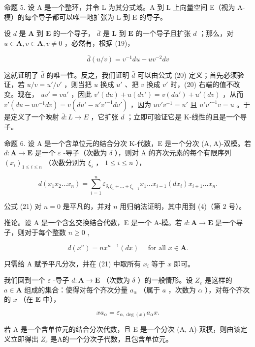 命题 5. 设 A 是一个整环，并令 L 为其分式域。A 到 L 上向量空间 E（视为 A-模）的每个导子都可以唯一地扩张为 L 到 E 的导子。

设 \(d\) 是 \(\mathbf{A}\) 到 \(\mathbf{E}\) 的一个导子， \(\bar{d}\) 是 \(\mathbf{L}\) 到 \(\mathbf{E}\) 的一个导子且扩张 \(d\) ；那么，对 \(u \in \mathbf{A}, v \in \mathbf{A}, v \neq 0\) ，必然有，根据 (19)，

\[
\bar {d} (u / v) = v ^ {- 1} d u - u v ^ {- 2} d v\tag{20}
\]

这就证明了 \(\bar{d}\) 的唯一性。反之，我们证明 \(\bar{d}\) 可以由公式 (20) 定义；首先必须验证，若 \(u / v = u' / v'\) ，则当把 \(u\) 换成 \(u'\) 、把 \(v\) 换成 \(v'\) 时，(20) 右端的值不改变。现在， \(uv' = vu'\) ，因此 \(v'(du) + u(dv') = v(du') + u'(dv)\) ，从而 \(v'(du - uv^{-1}dv) = v(du' - u'v'^{-1}dv')\) ，因为 \(uv'v^{-1} = u'\) 且 \(u'v'^{-1}v = u\) 。于是定义了一个映射 \(\bar{d}: L \to E\) ，它扩张 \(d\) ；立即可验证它是 K-线性的且是一个导子。

命题 6. 设 A 是一个含单位元的结合分次 K-代数，E 是一个分次 (A, A)-双模。若 \(d: \mathbf{A} \to \mathbf{E}\) 是一个 \(\varepsilon\) -导子（次数为 \(\delta\) ），则对 A 的齐次元素的每个有限序列 \((x_i)_{1 \leqslant i \leqslant n}\) （次数分别为 \(\xi_i\) ， \(1 \leqslant i \leqslant n\) ），

\[
d \left(x _ {1} x _ {2} \dots x _ {n}\right) = \sum_ {i = 1} ^ {n} \varepsilon_ {\delta, \xi_ {1} + \dots + \xi_ {i - 1}} x _ {1} \dots x _ {i - 1} \left(d x _ {i}\right) x _ {i + 1} \dots x _ {n}.\tag{21}
\]

公式 (21) 对 \(n = 0\) 是平凡的，并对 \(n\) 用归纳法证明，其中用到 (4)（第 2 号）。

推论。设 A 是一个含幺交换结合代数，E 是一个 A-模。若 \(d: \mathbf{A} \to \mathbf{E}\) 是一个导子，则对于每个整数 \(n \geqslant 0\) ,

\[
d (x ^ {n}) = n x ^ {n - 1} (d x) \quad \text { for all } x \in \mathbf {A}.\tag{22}
\]

只需给 A 赋予平凡分次，并在 (21) 中取所有 \(x_{i}\) 等于 \(x\) 即可。

我们回到一个 \(\varepsilon\) -导子 \(d: \mathbf{A} \to \mathbf{E}\) （次数为 \(\delta\) ）的一般情形。设 \(Z_{\varepsilon}\) 是这样的 \(a \in \mathbf{A}\) 组成的集合：使得对每个齐次分量 \(a_{\alpha}\) （属于 \(a\) ，次数为 \(\alpha\) ），对每个齐次的 \(x\) （在 \(\mathbf{E}\) 中），

\[
x a _ {\alpha} = \varepsilon_ {\alpha , \deg (x)} a _ {\alpha} x.\tag{23}
\]

若 A 是一个含单位元的结合分次代数，且 E 是一个分次 (A, A)-双模，则由该定义立即得出 \(Z_{\varepsilon}\) 是A的一个分次子代数，且包含单位元。

